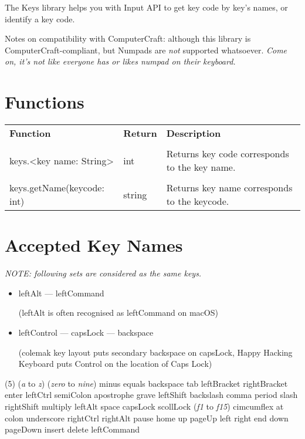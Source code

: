 The Keys library helps you with Input API to get key code by key's names, or identify a key code.

Notes on compatibility with ComputerCraft: although this library is ComputerCraft-compliant, but Numpads are \emph{not} supported whatsoever. \textit{Come on, it's not like everyone has or likes numpad on their keyboard.}

\section{Functions}

\begin{tabularx}{\textwidth}{l l X}
	\textbf{\large Function} & \textbf{\large Return} & \textbf{\large Description}
	\\ \\
	\endhead
	keys.<key name: String> & int & Returns key code corresponds to the key name.
	\\ \\
	keys.getName(keycode: int) & string & Returns key name corresponds to the keycode.
\end{tabularx}

\section{Accepted Key Names}

\emph{NOTE: following sets are considered as the same keys.}

\begin{itemize}
\item leftAlt --- leftCommand

(leftAlt is often recognised as leftCommand on macOS)

\item leftControl --- capsLock --- backspace

(colemak key layout puts secondary backspace on capsLock, Happy Hacking Keyboard puts Control on the location of Caps Lock)
\end{itemize}

\begin{tasks}[counter-format=\-](5)
	\task (\emph{a} to \emph{z})
	\task (\emph{zero} to \emph{nine})
	\task minus
	\task equals
	\task backspace
	\task tab
	\task leftBracket
	\task rightBracket
	\task enter
	\task leftCtrl
	\task semiColon
	\task apostrophe
	\task grave
	\task leftShift
	\task backslash
	\task comma
	\task period
	\task slash
	\task rightShift
	\task multiply
	\task leftAlt
	\task space
	\task capsLock
	\task scollLock
	\task (\emph{f1} to \emph{f15})
	\task cimcumflex
	\task at
	\task colon
	\task underscore
	\task rightCtrl
	\task rightAlt
	\task pause
	\task home
	\task up
	\task pageUp
	\task left
	\task right
	\task end
	\task down
	\task pageDown
	\task insert
	\task delete
	\task leftCommand
\end{tasks}